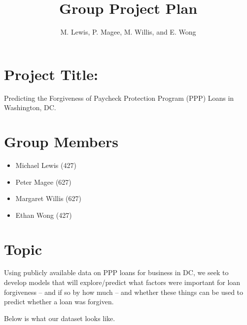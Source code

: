\documentclass[
  letterpaper,
  DIV=11,
  numbers=noendperiod]{scrartcl}
\title{Group Project Plan}
\author{M. Lewis, P. Magee, M. Willis, and E. Wong}
\date{}
\begin{document}
\maketitle
\ifdefined\Shaded\renewenvironment{Shaded}{\begin{tcolorbox}[interior hidden, borderline west={3pt}{0pt}{shadecolor}, breakable, sharp corners, enhanced, frame hidden, boxrule=0pt]}{\end{tcolorbox}}\fi

\hypertarget{project-title}{%
\section{Project Title:}\label{project-title}}

Predicting the Forgiveness of Paycheck Protection Program (PPP) Loans in
Washington, DC.

\hypertarget{group-members}{%
\section{Group Members}\label{group-members}}

\begin{itemize}
\item
  Michael Lewis (427)
\item
  Peter Magee (627)
\item
  Margaret Willis (627)
\item
  Ethan Wong (427)
\end{itemize}

\hypertarget{topic}{%
\section{Topic}\label{topic}}

Using publicly available data on PPP loans for business in DC, we seek
to develop models that will explore/predict what factors were important
for loan forgiveness -- and if so by how much -- and whether these
things can be used to predict whether a loan was forgiven.

Below is what our dataset looks like.
\end{document}
